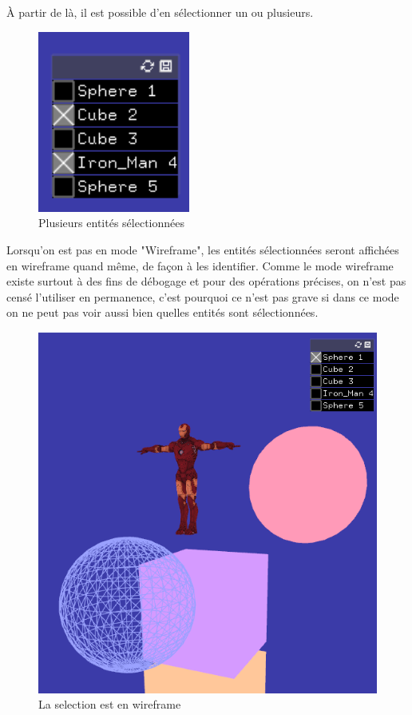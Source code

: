 À partir de là, il est possible d'en sélectionner un ou plusieurs.

\begin{figure}[h]
	\centering
	\includegraphics[width=5cm]{fig/menuSelectionPlusieurs.png}
	\caption{Plusieurs entités sélectionnées}
	\label{fig:test}
\end{figure}

\newpage

Lorsqu'on est pas en mode "Wireframe", les entités sélectionnées seront affichées en wireframe quand même, de façon à les identifier. Comme le mode wireframe existe surtout à des fins de débogage et pour des opérations précises, on n'est pas censé l'utiliser en permanence, c'est pourquoi ce n'est pas grave si dans ce mode on ne peut pas voir aussi bien quelles entités sont sélectionnées.

\begin{figure}[h]
	\centering
	\includegraphics[width=12cm]{fig/WireframeSelection.png}
	\caption{La selection est en wireframe}
	\label{fig:test}
\end{figure}

